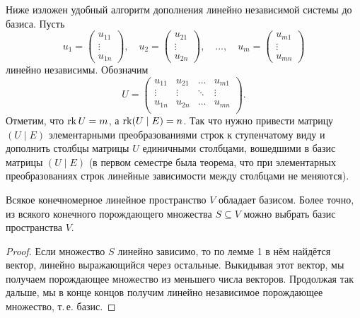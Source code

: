 \begin{remark}
    Ниже изложен удобный алгоритм дополнения линейно независимой системы до базиса. Пусть 
    \[
        u_1 = 
        \begin{pmatrix}
            u_{11}\\
            \vdots\\
            u_{1n}
        \end{pmatrix},\quad
        u_2 = 
        \begin{pmatrix}
            u_{21}\\
            \vdots\\
            u_{2n}
        \end{pmatrix},\quad\ldots,\quad
        u_m = 
        \begin{pmatrix}
            u_{m1}\\
            \vdots\\
            u_{mn}
        \end{pmatrix}
    \] линейно независимы. Обозначим
    \[
        U = 
        \begin{pmatrix}
            u_{11} & u_{21} & \ldots & u_{m1}\\
            \vdots & \vdots & \ddots & \vdots\\
            u_{1n} & u_{2n} & \ldots & u_{mn}\\
        \end{pmatrix}.
    \]
    Отметим, что $\operatorname{rk} U = m$, а $\operatorname{rk}(U \mid E) = n$. Так что нужно привести матрицу $(U \mid E)$ элементарными преобразованиями строк к ступенчатому виду и дополнить столбцы матрицы $U$ единичными столбцами, вошедшими в базис матрицы $(U \mid E)$ (в первом семестре была теорема, что при элементарных преобразованиях строк линейные зависимости между столбцами не меняются).
\end{remark}

\begin{lemma}
    Всякое конечномерное линейное пространство $V$ обладает базисом. Более точно, из всякого конечного порождающего множества $S \subseteq V$ можно выбрать базис пространства $V$.
\end{lemma}

\begin{proof}
    Если множество $S$ линейно зависимо, то по лемме 1 в нём найдётся вектор, линейно выражающийся через остальные. Выкидывая этот вектор, мы получаем порождающее множество из меньшего числа векторов. Продолжая так дальше, мы в конце концов получим линейно независимое порождающее множество, т.\,е. базис.
\end{proof}

